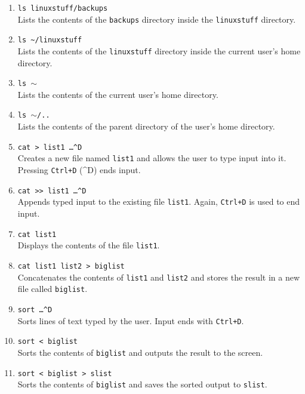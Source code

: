 \documentclass[a4paper]{article}
\begin{document}
\begin{enumerate}
\item \texttt{ls linuxstuff/backups}\\
  Lists the contents of the \texttt{backups} directory inside the \texttt{linuxstuff} directory.

\item \texttt{ls \~{}/linuxstuff}\\
  Lists the contents of the \texttt{linuxstuff} directory inside the current user's home directory.

\item \texttt{ls $\sim${}}\\
  Lists the contents of the current user's home directory.

\item \texttt{ls $\sim$/..}\\
  Lists the contents of the parent directory of the user's home directory.

\item \texttt{cat > list1 \dots \^{}D}\\
  Creates a new file named \texttt{list1} and allows the user to type input into it. Pressing \texttt{Ctrl+D} (\^{}D) ends input.

\item \texttt{cat >> list1 \dots \^{}D}\\
  Appends typed input to the existing file \texttt{list1}. Again, \texttt{Ctrl+D} is used to end input.

\item \texttt{cat list1}\\
  Displays the contents of the file \texttt{list1}.

\item \texttt{cat list1 list2 > biglist}\\
  Concatenates the contents of \texttt{list1} and \texttt{list2} and stores the result in a new file called \texttt{biglist}.

\item \texttt{sort \dots \^{}D}\\
  Sorts lines of text typed by the user. Input ends with \texttt{Ctrl+D}.

\item \texttt{sort < biglist}\\
  Sorts the contents of \texttt{biglist} and outputs the result to the screen.

\item \texttt{sort < biglist > slist}\\
  Sorts the contents of \texttt{biglist} and saves the sorted output to \texttt{slist}.


\end{enumerate}
\end{document}
